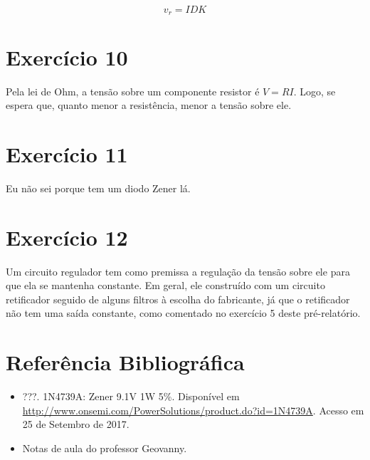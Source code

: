 \documentclass[12pt, a4paper, twoside]{article}
\begin{document}
$$v_r = IDK$$

\section{Exercício 10}

Pela lei de Ohm, a tensão sobre um componente resistor é $V=RI$. Logo, se espera que, quanto menor a resistência, menor a tensão sobre ele.

\section{Exercício 11}

Eu não sei porque tem um diodo Zener lá.

\section{Exercício 12}

Um circuito regulador tem como premissa a regulação da tensão sobre ele para que ela se mantenha constante. Em geral, ele construído com um circuito retificador seguido de alguns filtros à escolha do fabricante, já que o retificador não tem uma saída constante, como comentado no exercício 5 deste pré-relatório.

\section{Referência Bibliográfica}

\begin{itemize}
    \item ???. 1N4739A: Zener 9.1V 1W 5\%. Disponível em \url{http://www.onsemi.com/PowerSolutions/product.do?id=1N4739A}. Acesso em 25 de Setembro de 2017.
    \item Notas de aula do professor Geovanny.
\end{itemize}
\end{document}
